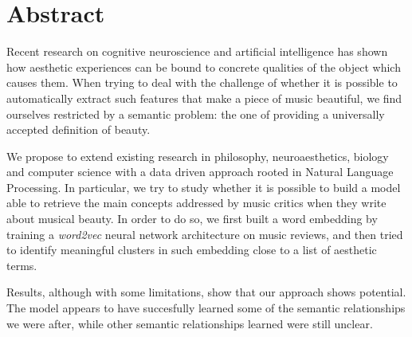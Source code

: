 \begingroup
\let\clearpage\relax
\let\cleardoublepage\relax
\let\cleardoublepage\relax

\chapter*{Abstract}
Recent research on cognitive neuroscience and artificial intelligence has shown how aesthetic experiences can be bound to concrete qualities of the object which causes them. When trying to deal with the challenge of whether it is possible to automatically extract such features that make a piece of music beautiful, we find ourselves restricted by a semantic problem: the one of providing a universally accepted definition of beauty.

We propose to extend existing research in philosophy, neuroaesthetics, biology and computer science with a data driven approach rooted in Natural Language Processing. In particular, we try to study whether it is possible to build a model able to retrieve the main concepts addressed by music critics when they write about musical beauty. In order to do so, we first built a word embedding by training a \emph{word2vec} neural network architecture on music reviews, and then tried to identify meaningful clusters in such embedding close to a list of aesthetic terms.

Results, although with some limitations, show that our approach shows potential. The model appears to have succesfully learned some of the semantic relationships we were after, while other semantic relationships learned were still unclear.
\endgroup

\vfill
